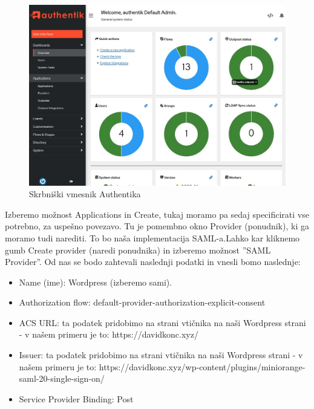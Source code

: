 \documentclass[a4paper,12pt,openright]{book}
\begin{document}
\begin{figure}[H]
\hspace{-3cm}
\includegraphics[scale=0.55]{diploma-FRI-vzorec_11maj2021/admin_inter.jpg}
\caption{Skrbniški vmesnik Authentika}
\label{fig}
\end{figure}

Izberemo možnost Applications in Create, tukaj moramo pa sedaj specificirati vse potrebno, za uspešno povezavo. Tu je pomembno okno Provider (ponudnik), ki ga moramo tudi narediti. To bo naša implementacija SAML-a.Lahko kar kliknemo gumb Create provider (naredi ponudnika) in izberemo možnost ''SAML Provider''. 
Od nas se bodo zahtevali naslednji podatki in vnesli bomo naslednje:
\begin{itemize}
    \item Name (ime): Wordpress (izberemo sami).
    \item Authorization flow: default-provider-authorization-explicit-consent
    \item ACS URL: ta podatek pridobimo na strani vtičnika na naši Wordpress strani - v našem primeru je to: https://davidkonc.xyz/
    \item Issuer: ta podatek pridobimo na strani vtičnika na naši Wordpress strani - v našem primeru je to: https://davidkonc.xyz/wp-content/plugins/miniorange-saml-20-single-sign-on/
    \item Service Provider Binding:  Post
\end{itemize}
\end{document}
